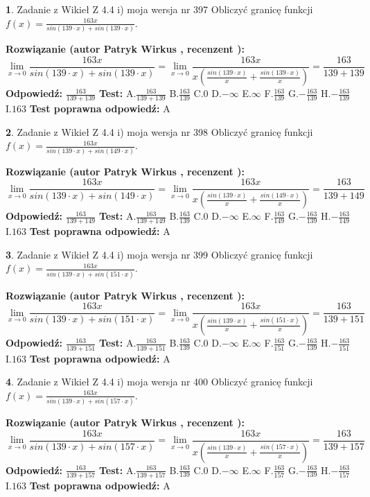 \documentclass[12pt, a4paper]{article}
\theoremstyle{definition} %
\newtheorem{zad}{}
\newcommand{\zadStart}[1]{\begin{zad}#1\newline}
\newcommand{\zadStop}{\end{zad}}
\newcommand{\rozwStart}[2]{\noindent \textbf{Rozwiązanie (autor #1 , recenzent #2): }\newline}
\newcommand{\rozwStop}{\newline}
\newcommand{\odpStart}{\noindent \textbf{Odpowiedź:}\newline}
\newcommand{\odpStop}{\newline}
\newcommand{\testStart}{\noindent \textbf{Test:}\newline}
\newcommand{\testStop}{\newline}
\newcommand{\kluczStart}{\noindent \textbf{Test poprawna odpowiedź:}\newline}
\newcommand{\kluczStop}{\newline}
\begin{document}
\zadStart{Zadanie z Wikieł Z 4.4 i) moja wersja nr 397}
Obliczyć granicę funkcji $f(x)=\frac{163x}{sin(139\cdot x) +sin(139\cdot x)}$.
\zadStop
\rozwStart{Patryk Wirkus}{}
$$\lim\limits_{x\to 0}\frac{163x}{sin(139\cdot x) +sin(139\cdot x)}=\lim\limits_{x\to 0}\frac{163x}{x(\frac{sin(139\cdot x)}{x}+\frac{sin(139\cdot x)}{x})}=\frac{163}{139+139}$$
\rozwStop
\odpStart
$\frac{163}{139+139}$
\odpStop
\testStart
A.$\frac{163}{139+139}$
B.$\frac{163}{139}$
C.$0$
D.$-\infty$
E.$\infty$
F.$\frac{163}{139}$
G.$-\frac{163}{139}$
H.$-\frac{163}{139}$
I.$163$
\testStop
\kluczStart
A
\kluczStop



\zadStart{Zadanie z Wikieł Z 4.4 i) moja wersja nr 398}
Obliczyć granicę funkcji $f(x)=\frac{163x}{sin(139\cdot x) +sin(149\cdot x)}$.
\zadStop
\rozwStart{Patryk Wirkus}{}
$$\lim\limits_{x\to 0}\frac{163x}{sin(139\cdot x) +sin(149\cdot x)}=\lim\limits_{x\to 0}\frac{163x}{x(\frac{sin(139\cdot x)}{x}+\frac{sin(149\cdot x)}{x})}=\frac{163}{139+149}$$
\rozwStop
\odpStart
$\frac{163}{139+149}$
\odpStop
\testStart
A.$\frac{163}{139+149}$
B.$\frac{163}{139}$
C.$0$
D.$-\infty$
E.$\infty$
F.$\frac{163}{149}$
G.$-\frac{163}{139}$
H.$-\frac{163}{149}$
I.$163$
\testStop
\kluczStart
A
\kluczStop



\zadStart{Zadanie z Wikieł Z 4.4 i) moja wersja nr 399}
Obliczyć granicę funkcji $f(x)=\frac{163x}{sin(139\cdot x) +sin(151\cdot x)}$.
\zadStop
\rozwStart{Patryk Wirkus}{}
$$\lim\limits_{x\to 0}\frac{163x}{sin(139\cdot x) +sin(151\cdot x)}=\lim\limits_{x\to 0}\frac{163x}{x(\frac{sin(139\cdot x)}{x}+\frac{sin(151\cdot x)}{x})}=\frac{163}{139+151}$$
\rozwStop
\odpStart
$\frac{163}{139+151}$
\odpStop
\testStart
A.$\frac{163}{139+151}$
B.$\frac{163}{139}$
C.$0$
D.$-\infty$
E.$\infty$
F.$\frac{163}{151}$
G.$-\frac{163}{139}$
H.$-\frac{163}{151}$
I.$163$
\testStop
\kluczStart
A
\kluczStop



\zadStart{Zadanie z Wikieł Z 4.4 i) moja wersja nr 400}
Obliczyć granicę funkcji $f(x)=\frac{163x}{sin(139\cdot x) +sin(157\cdot x)}$.
\zadStop
\rozwStart{Patryk Wirkus}{}
$$\lim\limits_{x\to 0}\frac{163x}{sin(139\cdot x) +sin(157\cdot x)}=\lim\limits_{x\to 0}\frac{163x}{x(\frac{sin(139\cdot x)}{x}+\frac{sin(157\cdot x)}{x})}=\frac{163}{139+157}$$
\rozwStop
\odpStart
$\frac{163}{139+157}$
\odpStop
\testStart
A.$\frac{163}{139+157}$
B.$\frac{163}{139}$
C.$0$
D.$-\infty$
E.$\infty$
F.$\frac{163}{157}$
G.$-\frac{163}{139}$
H.$-\frac{163}{157}$
I.$163$
\testStop
\kluczStart
A
\kluczStop
\end{document}
